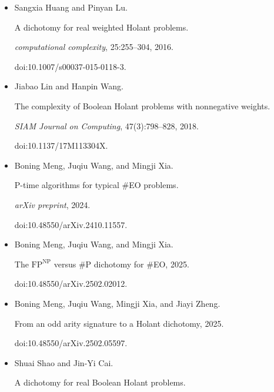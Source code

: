 \documentclass[10pt,a4paper]{article}
\begin{document}
\begin{itemize}
\item[] 
[21]

Sangxia Huang and Pinyan Lu.


A dichotomy for real weighted Holant problems.


\emph{computational complexity}, 25:255–304, 2016.


doi:10.1007/s00037-015-0118-3.





\item[] 
[22]

Jiabao Lin and Hanpin Wang.


The complexity of Boolean Holant problems with nonnegative
weights.


\emph{SIAM Journal on Computing}, 47(3):798–828, 2018.


doi:10.1137/17M113304X.





\item[] 
[23]

Boning Meng, Juqiu Wang, and Mingji Xia.


P-time algorithms for typical \#EO problems.


\emph{arXiv preprint}, 2024.


doi:10.48550/arXiv.2410.11557.





\item[] 
[24]

Boning Meng, Juqiu Wang, and Mingji Xia.


The $\text{FP}^{\text{NP}}$ versus \#P dichotomy for \#EO, 2025.


doi:10.48550/arXiv.2502.02012.





\item[] 
[25]

Boning Meng, Juqiu Wang, Mingji Xia, and Jiayi Zheng.


From an odd arity signature to a Holant dichotomy, 2025.


doi:10.48550/arXiv.2502.05597.





\item[] 
[26]

Shuai Shao and Jin-Yi Cai.


A dichotomy for real Boolean Holant problems.



\end{itemize}
\end{document}
